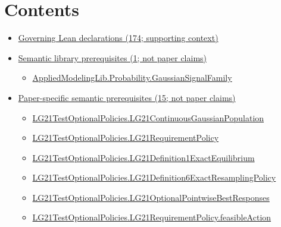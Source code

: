 \documentclass[10pt]{article}
\begin{document}
\section*{Contents}
\begin{itemize}[leftmargin=1.2em]
\item \hyperlink{governing-declaration-section-5ef5ef0364b6939c}{Governing Lean declarations (174; supporting context)}
\item \hyperlink{library-section-8c5533201d4a4697}{Semantic library prerequisites (1; not paper claims)}
\begin{itemize}[leftmargin=1.2em]
\item \hyperlink{library-prerequisite-c7f802398a145c63}{Applied\allowbreak{}Modeling\allowbreak{}Lib.\allowbreak{}Probability.\allowbreak{}Gaussian\allowbreak{}Signal\allowbreak{}Family}
\end{itemize}
\item \hyperlink{paper-prerequisite-section-5ef5ef0364b6939c}{Paper-specific semantic prerequisites (15; not paper claims)}
\begin{itemize}[leftmargin=1.2em]
\item \hyperlink{paper-prerequisite-f5e1c886d250142b}{LG21\allowbreak{}Test\allowbreak{}Optional\allowbreak{}Policies.\allowbreak{}LG21\allowbreak{}Continuous\allowbreak{}Gaussian\allowbreak{}Population}
\item \hyperlink{paper-prerequisite-c372c1ea09b2ca97}{LG21\allowbreak{}Test\allowbreak{}Optional\allowbreak{}Policies.\allowbreak{}LG21\allowbreak{}Requirement\allowbreak{}Policy}
\item \hyperlink{paper-prerequisite-74f58783760926f7}{LG21\allowbreak{}Test\allowbreak{}Optional\allowbreak{}Policies.\allowbreak{}LG21\allowbreak{}Definition1\allowbreak{}Exact\allowbreak{}Equilibrium}
\item \hyperlink{paper-prerequisite-13a547d7f13d2442}{LG21\allowbreak{}Test\allowbreak{}Optional\allowbreak{}Policies.\allowbreak{}LG21\allowbreak{}Definition6\allowbreak{}Exact\allowbreak{}Resampling\allowbreak{}Policy}
\item \hyperlink{paper-prerequisite-c2c420f15bf99600}{LG21\allowbreak{}Test\allowbreak{}Optional\allowbreak{}Policies.\allowbreak{}LG21\allowbreak{}Optional\allowbreak{}Pointwise\allowbreak{}Best\allowbreak{}Responses}
\item \hyperlink{paper-prerequisite-4ddc997ac8f43233}{LG21\allowbreak{}Test\allowbreak{}Optional\allowbreak{}Policies.\allowbreak{}LG21\allowbreak{}Requirement\allowbreak{}Policy.\allowbreak{}feasible\allowbreak{}Action}

\end{itemize}
\end{itemize}
\end{document}
